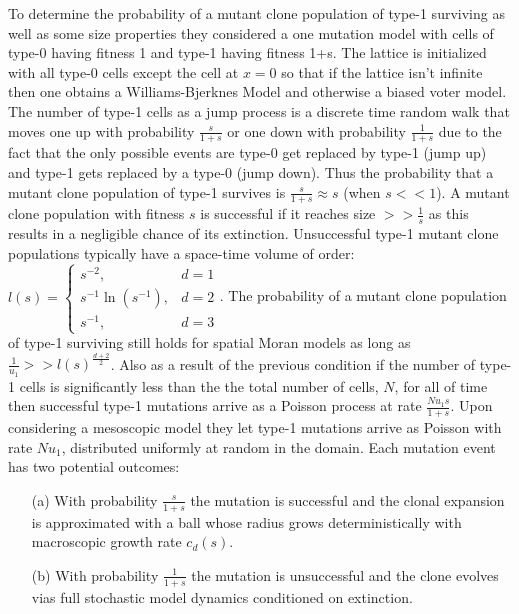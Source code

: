 \documentclass[\main/thesis.tex]{subfiles}
\begin{document}
To determine the probability of a mutant clone population of type-1 
surviving as well as some size properties they considered a one mutation 
model with cells of type-0 having fitness 1 and type-1 having fitness 1+s. The 
lattice is initialized with all type-0 cells except the cell at $x{=}0$ so that 
if the lattice isn't infinite then one obtains a Williams-Bjerknes Model and 
otherwise a biased voter model. The number of type-1 cells as a jump process is 
a discrete time random walk that moves one up with probability $\frac{s}{1{+}s}$ 
or one down with probability $\frac{1}{1{+}s}$ due to the fact that the only 
possible events are type-0 get replaced by type-1 (jump up) and type-1 gets 
replaced by a type-0 (jump down). Thus the probability that a mutant clone 
population of type-1 survives is $\frac{s}{1{+}s} \approx s$ (when $s << 1$). A 
mutant clone population with fitness $s$ is successful if it reaches size
$>> \frac{1}{s}$ as this results in a negligible chance of its extinction. 
Unsuccessful type-1 mutant clone populations typically have a space-time volume 
of order:
$l(s) {=} \begin{cases}
            s^{-2}, & d{=}1 \\
            s^{-1}\ln(s^{-1}), & d{=}2 \\
            s^{-1}, & d{=} 3 
          \end{cases}$.
The probability of a mutant clone population of type-1 surviving still holds for 
spatial Moran models as long as $\frac{1}{u_1} >> l(s)^{\frac{d{+}2}{2}}$. 
Also as a result of the previous condition if the number of type-1 cells is 
significantly less than the the total number of cells, $N$, for all of time then 
successful type-1 mutations arrive as a Poisson process at rate 
$\frac{Nu_1s}{1{+}s}$. Upon considering a mesoscopic model they let type-1 
mutations arrive as Poisson with rate $Nu_1$, distributed uniformly at random in 
the domain. Each mutation event has two potential outcomes:
\begin{itemize}
  \item[(a)] With probability $\frac{s}{1{+}s}$ the mutation is successful and 
             the clonal expansion is approximated with a ball whose radius grows 
             deterministically with macroscopic growth rate $c_d(s)$.
  \item[(b)] With probability $\frac{1}{1{+}s}$ the mutation is unsuccessful and 
             the clone evolves vias full stochastic model dynamics conditioned 
             on extinction.
\end{itemize}
\end{document}
